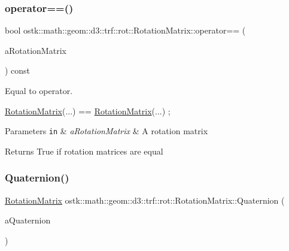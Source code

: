 \subsubsection{\texorpdfstring{operator==()}{operator==()}}
{\footnotesize\ttfamily bool ostk\+::math\+::geom\+::d3\+::trf\+::rot\+::\+Rotation\+Matrix\+::operator== (\begin{DoxyParamCaption}\item[{const \hyperlink{classostk_1_1math_1_1geom_1_1d3_1_1trf_1_1rot_1_1_rotation_matrix}{Rotation\+Matrix} \&}]{a\+Rotation\+Matrix }\end{DoxyParamCaption}) const}



Equal to operator. 


\begin{DoxyCode}
\hyperlink{classostk_1_1math_1_1geom_1_1d3_1_1trf_1_1rot_1_1_rotation_matrix_a5e6bed0779ad7db0c5bf26b2bd96f8ba}{RotationMatrix}(...) == \hyperlink{classostk_1_1math_1_1geom_1_1d3_1_1trf_1_1rot_1_1_rotation_matrix_a5e6bed0779ad7db0c5bf26b2bd96f8ba}{RotationMatrix}(...) ;
\end{DoxyCode}



\begin{DoxyParams}[1]{Parameters}
\mbox{\tt in}  & {\em a\+Rotation\+Matrix} & A rotation matrix \\
\hline
\end{DoxyParams}
\begin{DoxyReturn}{Returns}
True if rotation matrices are equal 
\end{DoxyReturn}
\mbox{\label{classostk_1_1math_1_1geom_1_1d3_1_1trf_1_1rot_1_1_rotation_matrix_ac327eae5f7a354639d05b6bdffdae640}} 
\subsubsection{\texorpdfstring{Quaternion()}{Quaternion()}}
{\footnotesize\ttfamily \hyperlink{classostk_1_1math_1_1geom_1_1d3_1_1trf_1_1rot_1_1_rotation_matrix}{Rotation\+Matrix} ostk\+::math\+::geom\+::d3\+::trf\+::rot\+::\+Rotation\+Matrix\+::\+Quaternion (\begin{DoxyParamCaption}\item[{const \hyperlink{classostk_1_1math_1_1geom_1_1d3_1_1trf_1_1rot_1_1_quaternion}{rot\+::\+Quaternion} \&}]{a\+Quaternion }\end{DoxyParamCaption})\hspace{0.3cm}{\ttfamily [static]}}



